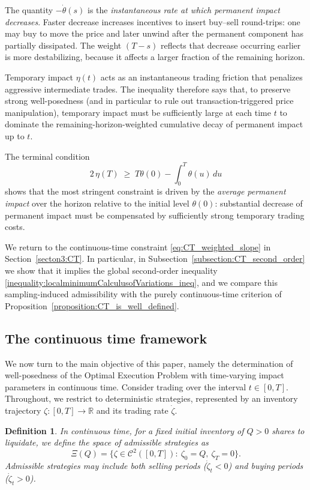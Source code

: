 \documentclass[final,3p,authoryear,12pt]{elsarticle}
\newtheorem{definition}{Definition}
\begin{document}
The quantity $-\dot\theta(s)$ is the \emph{instantaneous rate at which permanent
impact decreases}. Faster decrease increases incentives to insert buy--sell
round-trips: one may buy to move the price and later unwind after the
permanent component has partially dissipated. The weight $(T-s)$ reflects
that decrease occurring earlier is more destabilizing, because it affects a
larger fraction of the remaining horizon.

Temporary impact $\eta(t)$ acts as an instantaneous trading friction that
penalizes aggressive intermediate trades. The inequality therefore says
that, to preserve strong well-posedness (and in particular to rule out
transaction-triggered price manipulation),
temporary impact must be sufficiently large at each time $t$ to dominate the
remaining-horizon-weighted cumulative decay of permanent impact up to $t$.

The terminal condition
\[
2\,\eta(T)\;\ge\;T\theta(0)-\int_{0}^{T}\theta(u)\,du
\]
shows that the most stringent constraint is driven by the \emph{average permanent impact} over the horizon relative to the initial level $\theta(0)$:
substantial decrease of permanent impact must be compensated by sufficiently
strong temporary trading costs.

\medskip
We return to the continuous-time constraint \eqref{eq:CT_weighted_slope} in
Section~\ref{secton3:CT}. In particular, in
Subsection~\ref{subsection:CT_second_order} we show that it implies the global
second-order inequality \eqref{inequality:localminimumCalculusofVariations_ineq},
and we compare this sampling-induced admissibility with the purely
continuous-time criterion of Proposition~\ref{proposition:CT_is_well_defined}.






\subsection{The continuous time framework}

We now turn to the main objective of this paper, namely the determination of
well-posedness of the Optimal Execution Problem with time-varying impact
parameters in continuous time. Consider trading over the interval $t\in[0,T]$.
Throughout, we restrict to deterministic strategies, represented by an
inventory trajectory $\zeta:[0,T]\to\mathbb{R}$ and its trading rate
$\dot\zeta$.
\begin{definition}
\label{def:liquidation}
In continuous time, for a fixed initial inventory of $Q>0$ shares to
liquidate, we define the space of admissible strategies as
\[
\Xi(Q)
= \Big\{\zeta\in\mathcal{C}^{2}([0,T]):\ \zeta_{0}=Q,\ \zeta_{T}=0\Big\}.
\]
Admissible strategies may include both selling periods
($\dot\zeta_t<0$) and buying periods ($\dot\zeta_t>0$).
\end{definition}
\end{document}
